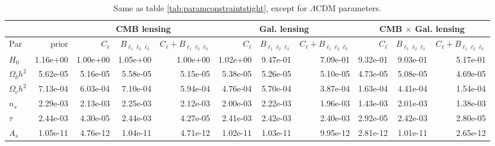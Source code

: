 \documentclass[11pt]{article} %
\begin{document}
\begin{table}[h!]
\begin{tabular}{|l|r|rrr|rrr|rrr|}
        \hline
        && \multicolumn{3}{c|}{CMB lensing}& \multicolumn{3}{c|}{Gal. lensing}& \multicolumn{3}{c|}{CMB $\times$ Gal. lensing} \\
        \hline
         Par            &   prior &   $C_\ell$ &   $B_{\ell_1\ell_2\ell_3}$ &   $C_\ell + B_{\ell_1\ell_2\ell_3}$ &   $C_\ell$ &   $B_{\ell_1\ell_2\ell_3}$ &   $C_\ell + B_{\ell_1\ell_2\ell_3}$ &   $C_\ell$ &   $B_{\ell_1\ell_2\ell_3}$ &   $C_\ell + B_{\ell_1\ell_2\ell_3}$ \\
        \hline
        $H_0$          &    1.16e+00 &  1.00e+00 &  1.05e+00 &        1.00e+00 & 1.02e+00 & 9.47e-01 &      7.09e-01 &      9.32e-01 &      9.03e-01 &             5.17e-01 \\
        $\Omega_b h^2$ &    5.62e-05 &  5.16e-05 &  5.58e-05 &        5.15e-05 & 5.38e-05 & 5.26e-05 &      5.10e-05 &      4.73e-05 &      5.08e-05 &             4.69e-05 \\
        $\Omega_c h^2$ &    7.13e-04 &  6.03e-04 &  7.10e-04 &        5.94e-04 & 4.76e-04 & 5.70e-04 &      3.87e-04 &      1.63e-04 &      4.41e-04 &             1.54e-04 \\
        $n_s$          &    2.29e-03 &  2.13e-03 &  2.25e-03 &        2.12e-03 & 2.00e-03 & 2.22e-03 &      1.96e-03 &      1.43e-03 &      2.01e-03 &             1.38e-03 \\
        $\tau$         &    2.44e-03 &  4.30e-05 &  2.44e-03 &        4.27e-05 & 2.41e-03 & 2.42e-03 &      2.40e-03 &      2.92e-05 &      2.42e-03 &             2.80e-05 \\
        $A_s$          &    1.05e-11 &  4.76e-12 &  1.04e-11 &        4.71e-12 & 1.02e-11 & 1.03e-11 &      9.95e-12 &      2.81e-12 &      1.01e-11 &             2.65e-12 \\
       \hline
        \end{tabular}
        \caption{Same as table \ref{tab:paramconstraintstight}, except for $\Lambda$CDM parameters.}
        \label{tab:paramconstraintsall}
\end{table}
\end{document}
